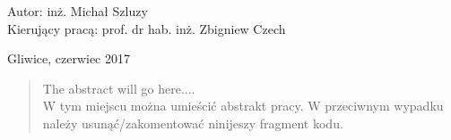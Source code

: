 \begin{onehalfspacing}
\begin{center}
\large
\begin{flushleft}
Autor: inż. Michał Szluzy  \\
Kierujący pracą:  prof. dr hab. inż. Zbigniew Czech \\
\end{flushleft}

\vspace{3cm}
Gliwice, czerwiec 2017
\end{center}
\end{onehalfspacing}

\singlespacing
\newpage
\thispagestyle{empty}
\mbox{}


\begin{abstract}
The abstract will go here.... \\
W tym miejscu można umieścić abstrakt pracy. W przeciwnym wypadku należy usunąć/zakomentować ninijeszy fragment kodu.
\end{abstract}


\doublespacing
\newpage
\thispagestyle{empty}
\mbox{}

\setcounter{page}{0} \pagestyle{plain}


\tableofcontents

\listoffigures
\listoftables



\pagestyle{fancy}
